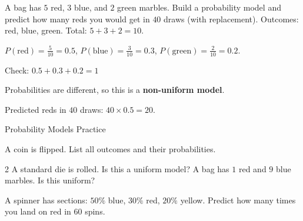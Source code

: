 \begin{stepExample}{A bag has $5$ red, $3$ blue, and $2$ green marbles. Build a probability model and predict how many reds you would get in $40$ draws (with replacement).}
     Outcomes: red, blue, green. Total: $5 + 3 + 2 = 10$.

     $P(\text{red}) = \frac{5}{10} = 0.5$, \; $P(\text{blue}) = \frac{3}{10} = 0.3$, \; $P(\text{green}) = \frac{2}{10} = 0.2$.\par
    Check: $0.5 + 0.3 + 0.2 = 1$ \checkmark

     Probabilities are different, so this is a \textbf{non-uniform model}.

     Predicted reds in $40$ draws: $40 \times 0.5 = 20$.
\end{stepExample}


\newpage
\begin{stepPractice}{Probability Models Practice}
    \resetProblems

    \prob A coin is flipped. List all outcomes and their probabilities. \answerBlank[3cm]

    \begin{multicols}{2}
    \prob A standard die is rolled. Is this a uniform model? \answerBlank[2cm]
    \prob A bag has $1$ red and $9$ blue marbles. Is this uniform? \answerBlank[2cm]
    \end{multicols}

    \prob A spinner has sections: $50\%$ blue, $30\%$ red, $20\%$ yellow. Predict how many times you land on red in $60$ spins. \answerBlank[2cm]

\end{stepPractice}
